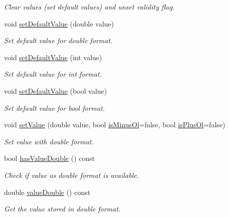 \begin{DoxyCompactItemize}
\begin{DoxyCompactList}\small\item\em Clear values (set default values) and unset validity flag. \end{DoxyCompactList}\item 
void \hyperlink{classmdt_value_a51d075b0cc64ff5481533bcfc8d3a7f4}{set\-Default\-Value} (double value)
\begin{DoxyCompactList}\small\item\em Set default value for double format. \end{DoxyCompactList}\item 
void \hyperlink{classmdt_value_aad4a2fb80d76fc2924ea1a72ce529167}{set\-Default\-Value} (int value)
\begin{DoxyCompactList}\small\item\em Set default value for int format. \end{DoxyCompactList}\item 
void \hyperlink{classmdt_value_a82ecd7744702a5e152404c1b05b1a69d}{set\-Default\-Value} (bool value)
\begin{DoxyCompactList}\small\item\em Set default value for bool format. \end{DoxyCompactList}\item 
void \hyperlink{classmdt_value_aa4573c55ea1cc6c55547b09db8c9d521}{set\-Value} (double value, bool \hyperlink{classmdt_value_a4de0d0c8a02cdd4c02adace4108db326}{is\-Minus\-Ol}=false, bool \hyperlink{classmdt_value_a033ad1d20812dddf38530a5f190033da}{is\-Plus\-Ol}=false)
\begin{DoxyCompactList}\small\item\em Set value with double format. \end{DoxyCompactList}\item 
bool \hyperlink{classmdt_value_a83d56329f2fd051f3cc32fd32f758e24}{has\-Value\-Double} () const 
\begin{DoxyCompactList}\small\item\em Check if value as double format is available. \end{DoxyCompactList}\item 
double \hyperlink{classmdt_value_aceae9e2ab20910c47272d523735b16e0}{value\-Double} () const 
\begin{DoxyCompactList}\small\item\em Get the value stored in double format. \end{DoxyCompactList}\item 

\end{DoxyCompactItemize}
